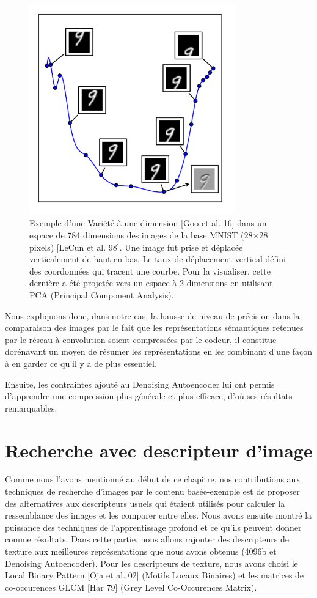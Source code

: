 \begin{figure}[H]
	\centering
		\includegraphics[width=3.5in]{Figures/manifold.png}
	\caption[Res]{Exemple d'une Variété à une dimension [Goo et al. 16] dans un espace de 784 dimensions des images de la base MNIST (28×28 pixels) [LeCun et al. 98]. Une image fut prise et déplacée verticalement de haut en bas. Le taux de déplacement vertical défini des coordonnées qui tracent une courbe. Pour la visualiser, cette dernière a été projetée vers un espace à 2 dimensions en utilisant PCA (Principal Component Analysis).}
	\label{fig:Electron}
\end{figure}


	Nous expliquons donc, dans notre cas, la hausse de niveau de précision dans la comparaison des images par le fait que les représentations sémantiques retenues par le réseau à convolution soient compressées par le codeur, il constitue dorénavant un moyen de résumer les représentations en les combinant d'une façon à en garder ce qu'il y a de plus essentiel.

Ensuite, les contraintes ajouté au Denoising Autoencoder lui ont permis d'apprendre une compression plus générale et plus efficace, d’où ses résultats remarquables.


\section{Recherche avec descripteur d'image}
	Comme nous l'avons mentionné au début de ce chapitre, nos contributions aux techniques de recherche d'images par le contenu basée-exemple est de proposer des alternatives aux descripteurs usuels qui étaient utilisés pour calculer la ressemblance des images et les comparer entre elles. Nous avons ensuite montré la puissance des techniques de l'apprentissage profond et ce qu'ils peuvent donner comme résultats. Dans cette partie, nous allons rajouter des descripteurs de texture aux meilleures représentations que nous avons obtenus (4096b et Denoising Autoencoder). Pour les descripteurs de texture, nous avons choisi le Local Binary Pattern [Oja et al. 02] (Motifs Locaux Binaires) et les matrices de co-occurences GLCM [Har 79] (Grey Level Co-Occurences Matrix).

